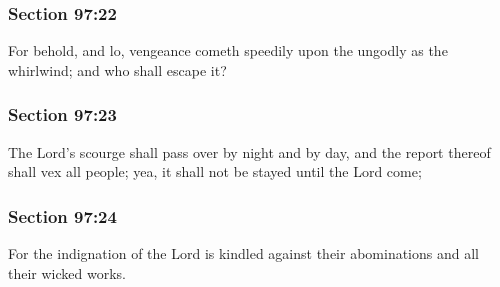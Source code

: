 	\subsubsection{Section 97:22} %
		\label{DC97-22}

		For behold, and lo, vengeance cometh speedily upon the ungodly as the whirlwind; and who shall escape it?


	\subsubsection{Section 97:23} %
		\label{DC97-23}

		The Lord's scourge shall pass over by night and by day, and the report thereof shall vex all people; yea, it shall not be stayed until the Lord come;


	\subsubsection{Section 97:24} %
		\label{DC97-24}

		For the indignation of the Lord is kindled against their abominations and all their wicked works.


